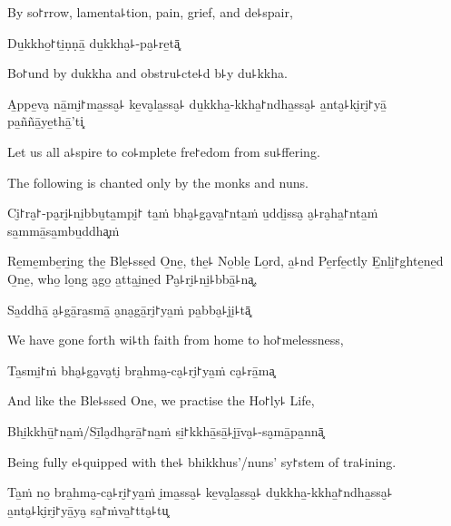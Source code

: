 \begin{english}
  By so꜓rrow, lamenta꜕tion, pain, grief, and de꜕spair,
\end{english}

Du̱kkho̱꜓ti̱ṇṇā̱ du̱kkha̮꜕-pa̮꜕re̱tā͓

\begin{english}
  Bo꜓und by dukkha and obstru꜕cte꜕d b꜕y du꜕kkha.
\end{english}

A̱ppe̱va̮ nā̱mi̮꜓ma̱ssa̮꜕ ke̱va̮la̱ssa̮꜕ du̱kkha̱-kkha̱꜓ndha̱ssa̮꜕ a̱nta̮꜕ki̮ri̮꜓yā̱ \\pa̱ññā̱ye̱thā̱'ti͓

\begin{english}
  Let us all a꜕spire to co꜕mplete fre꜓edom from su꜕ffering.
\end{english}

\begin{instruction}
  The following is chanted only by the monks and nuns.
\end{instruction}

Ci̮꜓ra̮꜓-pa̮ri̮꜕ni̱bbu̮ta̱mpi̮꜓ ta̱ṁ bha̮꜕ga̮va̱꜓nta̱ṁ u̱ddi̱ssa̮ a̮꜕ra̮ha̱꜓nta̱ṁ sa̱mmā̱sa̱mbu̱ddha͓ṁ

\begin{english}
  Re̱me̱mbe̱ri̱ng the̱ Ble̱꜕sse̱d O̱ne̱, the̱꜕ No̱ble̱ Lo̱rd, a̱꜕nd Pe̱rfe̱ctly E̱nli̱꜓ghte̱ne̱d O̱ne̱, who̱ lo̱ng a̮go̱ a̱tta̱i̮ne̱d Pa̮꜕ri̮꜕ni̱꜕bbā̱꜕na͓,
\end{english}

Sa̱ddhā̱ a̮꜕gā̱ra̱smā̱ a̮na̮gā̱ri̮꜓ya̱ṁ pa̱bba̮꜕ji̮꜕tā͓

\begin{english}
  We have gone forth wi꜕th faith from home to ho꜓melessness,
\end{english}

Ta̱smi̱꜓ṁ bha̮꜕ga̮va̮ti̮ bra̱hma̮-ca̮꜕ri̮꜓ya̱ṁ ca̮꜕rā̱ma͓

\begin{english}
  And like the Ble꜕ssed One, we practise the Ho꜓ly꜕ Life,
\end{english}

Bhi̱kkhū̱꜓na̱ṁ/Sī̱la̮dha̮rā̱꜓na̱ṁ si̱꜓kkhā̱sā̱꜕jī̱va̮꜕-sa̮mā̱pa̱nnā͓

\begin{english}
  Being fully e꜕quipped with the꜕ bhikkhus'/nuns' sy꜓stem of tra꜕ining.
\end{english}

Ta̱ṁ no̱ bra̱hma̮-ca̮꜕ri̮꜓ya̱ṁ i̮ma̱ssa̮꜕ ke̱va̮la̱ssa̮꜕ du̱kkha̱-kkha̱꜓ndha̱ssa̮꜕ a̱nta̮꜕ki̮ri̮꜓yā̱ya̮ sa̱꜓ṁva̱꜓tta̮꜕tu͓

